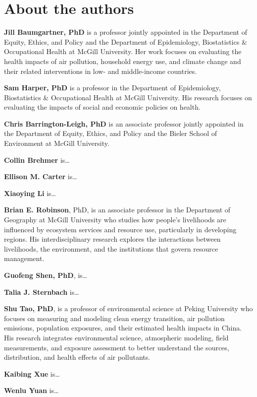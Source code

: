 \documentclass[
  letterpaper,
  DIV=11,
  numbers=noendperiod]{scrartcl}
\begin{document}
\section*{About the authors}\label{about-the-authors}

\textbf{Jill Baumgartner, PhD} is a professor jointly appointed in the
Department of Equity, Ethics, and Policy and the Department of
Epidemiology, Biostatistics \& Occupational Health at McGill University.
Her work focuses on evaluating the health impacts of air pollution,
household energy use, and climate change and their related interventions
in low- and middle-income countries.

\textbf{Sam Harper, PhD} is a professor in the Department of
Epidemiology, Biostatistics \& Occupational Health at McGill University.
His research focuses on evaluating the impacts of social and economic
policies on health.

\textbf{Chris Barrington-Leigh, PhD} is an associate professor jointly
appointed in the Department of Equity, Ethics, and Policy and the Bieler
School of Environment at McGill University.

\textbf{Collin Brehmer} is\ldots{}

\textbf{Ellison M. Carter} is\ldots{}

\textbf{Xiaoying Li} is\ldots{}

\textbf{Brian E. Robinson}, PhD, is an associate professor in the
Department of Geography at McGill University who studies how people's
livelihoods are influenced by ecosystem services and resource use,
particularly in developing regions. His interdisciplinary research
explores the interactions between livelihoods, the environment, and the
institutions that govern resource management.

\textbf{Guofeng Shen, PhD}, is\ldots{}

\textbf{Talia J. Sternbach} is\ldots{}

\textbf{Shu Tao, PhD}, is a professor of environmental science at Peking
University who focuses on measuring and modeling clean energy
transition, air pollution emissions, population exposures, and their
estimated health impacts in China. His research integrates environmental
science, atmospheric modeling, field measurements, and exposure
assessment to better understand the sources, distribution, and health
effects of air pollutants.

\textbf{Kaibing Xue} is\ldots{}

\textbf{Wenlu Yuan} is\ldots{}
\end{document}
